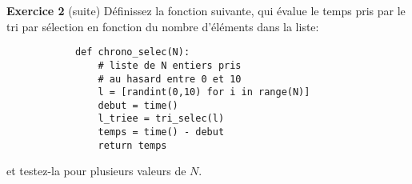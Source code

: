 \documentclass[10pt,xcolor={dvipsnames}]{beamer}
\newcounter{Exercice}
\begin{document}
\begin{frame}[fragile]
	\begin{block}{\textbf{Exercice 2} (suite)}
		Définissez la fonction suivante, qui évalue le temps pris par le tri par sélection en fonction du nombre d'éléments dans la liste:
		\begin{lstlisting}
			def chrono_selec(N):
				# liste de N entiers pris
				# au hasard entre 0 et 10
				l = [randint(0,10) for i in range(N)]
				debut = time()
				l_triee = tri_selec(l)
				temps = time() - debut
				return temps
		\end{lstlisting}
		et testez-la pour plusieurs valeurs de $N$.
	\end{block}
\end{frame}
\end{document}
